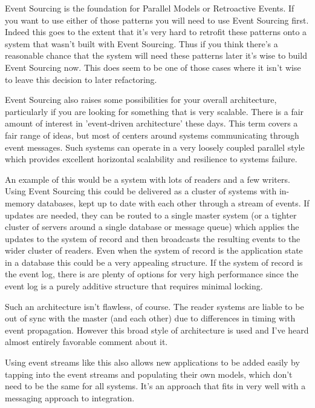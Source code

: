Event Sourcing is the foundation for Parallel Models or Retroactive Events. If you want to use either of those patterns you will need to use Event Sourcing first. Indeed this goes to the extent that it's very hard to retrofit these patterns onto a system that wasn't built with Event Sourcing. Thus if you think there's a reasonable chance that the system will need these patterns later it's wise to build Event Sourcing now. This does seem to be one of those cases where it isn't wise to leave this decision to later refactoring.

Event Sourcing also raises some possibilities for your overall architecture, particularly if you are looking for something that is very scalable. There is a fair amount of interest in 'event-driven architecture' these days. This term covers a fair range of ideas, but most of centers around systems communicating through event messages. Such systems can operate in a very loosely coupled parallel style which provides excellent horizontal scalability and resilience to systems failure.

An example of this would be a system with lots of readers and a few writers. Using Event Sourcing this could be delivered as a cluster of systems with in-memory databases, kept up to date with each other through a stream of events. If updates are needed, they can be routed to a single master system (or a tighter cluster of servers around a single database or message queue) which applies the updates to the system of record and then broadcasts the resulting events to the wider cluster of readers. Even when the system of record is the application state in a database this could be a very appealing structure. If the system of record is the event log, there is are plenty of options for very high performance since the event log is a purely additive structure that requires minimal locking.

Such an architecture isn't flawless, of course. The reader systems are liable to be out of sync with the master (and each other) due to differences in timing with event propagation. However this broad style of architecture is used and I've heard almost entirely favorable comment about it.

Using event streams like this also allows new applications to be added easily by tapping into the event streams and populating their own models, which don't need to be the same for all systems. It's an approach that fits in very well with a messaging approach to integration.


